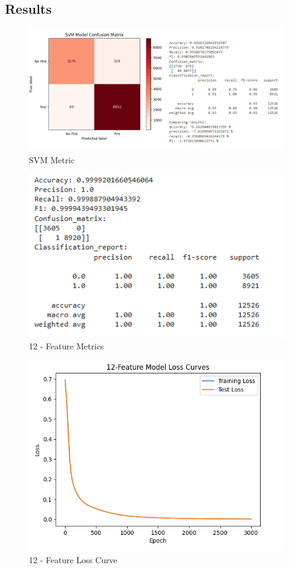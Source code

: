 \documentclass[conference]{IEEEtran}
\begin{document}
\subsection{Results} 

\begin{figure}
    \centering
    \includegraphics[width=0.75\linewidth]{images/SVM.png}
    \caption{SVM Metric}
    \label{fig: SVM Model}
\end{figure}

\begin{figure}
    \centering
    \includegraphics[width=0.75\linewidth]{images/12acc.png}
    \caption{12 - Feature Metrics}
    \label{fig: 1.0 }
\end{figure}

\begin{figure}
    \centering
    \includegraphics[width=0.75\linewidth]{images/12CM.png}
    \caption{12 - Feature Loss Curve}
    \label{fig: 1.2}
\end{figure}
\end{document}
